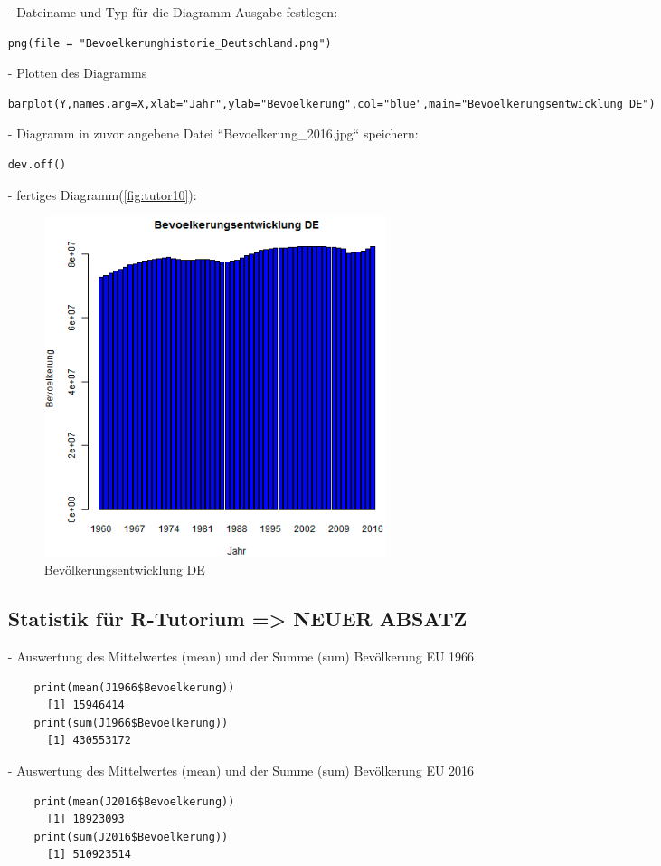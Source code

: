 \begin{itemize}
\item[-]Dateiname und Typ für die Diagramm-Ausgabe festlegen:
\begin{lstlisting}
png(file = "Bevoelkerunghistorie_Deutschland.png")
\end{lstlisting}
\item[-]Plotten des Diagramms
\begin{lstlisting}
barplot(Y,names.arg=X,xlab="Jahr",ylab="Bevoelkerung",col="blue",main="Bevoelkerungsentwicklung DE")
\end{lstlisting}
\item[-]Diagramm in zuvor angebene Datei ``Bevoelkerung\_2016.jpg`` speichern:
\begin{lstlisting}
dev.off()
\end{lstlisting}
\item[-]fertiges Diagramm(\autoref{fig:tutor10}):
\begin{figure}[!htb]
        \begin{minipage}{1\textwidth}
                \centering
                \includegraphics[width=0.50\textwidth]{pics/tutor10.png}\par\vspace{0cm}
                \caption{Bevölkerungsentwicklung DE}
                \label{fig:tutor10}
        \end{minipage}
\end{figure}
\subsection*{Statistik für R-Tutorium => NEUER ABSATZ}
\item[-]Auswertung des Mittelwertes (mean) und der Summe (sum) Bevölkerung EU 1966
\begin{lstlisting}
	print(mean(J1966$Bevoelkerung))
	  [1] 15946414
	print(sum(J1966$Bevoelkerung))
	  [1] 430553172
\end{lstlisting}

\item[-]Auswertung des Mittelwertes (mean) und der Summe (sum) Bevölkerung EU 2016
\begin{lstlisting}
	print(mean(J2016$Bevoelkerung))
	  [1] 18923093
	print(sum(J2016$Bevoelkerung))
	  [1] 510923514
\end{lstlisting}

\end{itemize}
